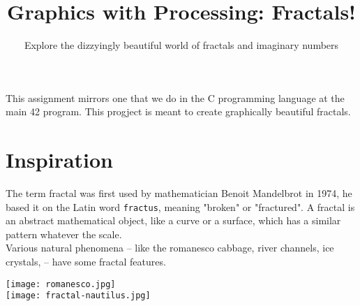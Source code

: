 \documentclass{42-en}
\begin{document}
\title{Graphics with Processing: Fractals!}
\subtitle{Explore the dizzyingly beautiful world of fractals and imaginary numbers}


\summary
{
	This assignment mirrors one that we do in the C programming language at the main 42 program. This progject is meant to create graphically beautiful fractals.
}

\maketitle

\tableofcontents



\chapter{Inspiration}

The term fractal was first used by mathematician Benoit Mandelbrot in 1974,
he based it on the Latin word \texttt{fractus}, meaning "broken" or "fractured".
A fractal is an abstract mathematical object, like a curve or a surface, which has a similar
pattern whatever the scale.\\

Various natural phenomena – like the romanesco cabbage, river channels, ice crystals, – have some fractal features.\\

\begin{center}
\texttt{[image: romanesco.jpg]}
\\
\texttt{[image: fractal-nautilus.jpg]}
\end{center}

\end{document}
